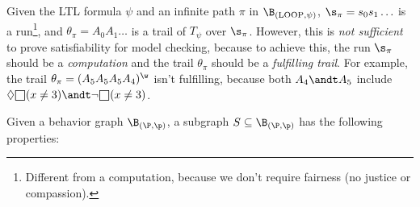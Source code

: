 \documentclass[oneside]{academica}
\begin{document}
\begin{example}
  \bigskip
  Given the LTL formula $\psi$ and an infinite path $\pi$ in $\B_{(\text{LOOP},\psi)}$, $\s_\pi = s_0 s_1 \ldots$ is a run\footnote{Different from a computation, because we don't require fairness (no justice or compassion).}, and $\theta_\pi = A_0 A_1 \ldots$ is a trail of $T_\psi$ over $\s_\pi$.
  However, this is \textit{not sufficient} to prove satisfiability for model checking, because to achieve this, the run $\s_\pi$ should be a \textit{computation} and the trail $\theta_\pi$ should be a \textit{fulfilling trail}.
  For example, the trail $\theta_\pi = (A_5 A_5 A_5 A_4)^\w$ isn't fulfilling, because both $A_4 \andt A_5$ include $\Diamond\msquare(x \neq 3) \andt \neg\msquare(x \neq 3)$.
\end{example}

\begin{definition*}
  Given a behavior graph $\bgraph$, a subgraph $S \subseteq \bgraph$ has the following properties:
\end{definition*}
\end{document}
